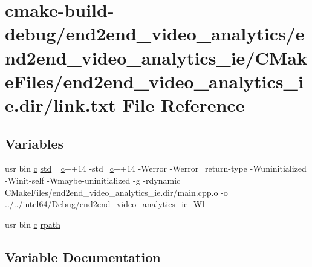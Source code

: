 \hypertarget{end2end__video__analytics_2end2end__video__analytics__ie_2CMakeFiles_2end2end__video__analytics__ie_8dir_2link_8txt}{}\section{cmake-\/build-\/debug/end2end\+\_\+video\+\_\+analytics/end2end\+\_\+video\+\_\+analytics\+\_\+ie/\+C\+Make\+Files/end2end\+\_\+video\+\_\+analytics\+\_\+ie.dir/link.txt File Reference}
\label{end2end__video__analytics_2end2end__video__analytics__ie_2CMakeFiles_2end2end__video__analytics__ie_8dir_2link_8txt}
\subsection*{Variables}
\begin{DoxyCompactItemize}
\item 
usr bin \hyperlink{CMakeCache_8txt_aac1d6a1710812201527c735f7c6afbaa}{c} \hyperlink{end2end__video__analytics_2end2end__video__analytics__ie_2CMakeFiles_2end2end__video__analytics__ie_8dir_2link_8txt_a1ccfea5f558575a112db71eeb271fabf}{std} =\hyperlink{CMakeCache_8txt_aac1d6a1710812201527c735f7c6afbaa}{c}++14 -\/std=\hyperlink{CMakeCache_8txt_aac1d6a1710812201527c735f7c6afbaa}{c}++14 -\/Werror -\/Werror=return-\/type -\/Wuninitialized -\/Winit-\/self -\/Wmaybe-\/uninitialized -\/g -\/rdynamic C\+Make\+Files/end2end\+\_\+video\+\_\+analytics\+\_\+ie.\+dir/main.\+cpp.\+o -\/o ../../intel64/Debug/end2end\+\_\+video\+\_\+analytics\+\_\+ie -\/\hyperlink{thirdparty_2extension_2CMakeFiles_2cpu__extension_8dir_2link_8txt_af9ccbf658ed2deb89d0d79f211e5b033}{Wl}
\item 
usr bin \hyperlink{CMakeCache_8txt_aac1d6a1710812201527c735f7c6afbaa}{c} \hyperlink{end2end__video__analytics_2end2end__video__analytics__ie_2CMakeFiles_2end2end__video__analytics__ie_8dir_2link_8txt_ab9d7fd7120fafa2118a4e08c1df697c7}{rpath}
\end{DoxyCompactItemize}


\subsection{Variable Documentation}
